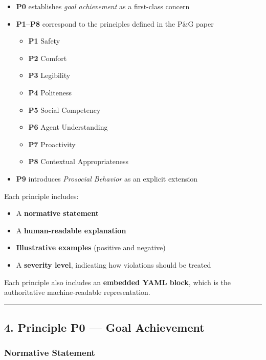 \documentclass[utf8]{frontiers_suppmat} %
\providecommand{\tightlist}{%
  \setlength{\itemsep}{0pt}\setlength{\parskip}{0pt}}
\begin{document}
\begin{itemize}
\tightlist
\item
  \textbf{P0} establishes \emph{goal achievement} as a first-class
  concern
\item
  \textbf{P1--P8} correspond to the principles defined in the P\&G paper

  \begin{itemize}
  \tightlist
  \item
    \textbf{P1} Safety
  \item
    \textbf{P2} Comfort
  \item
    \textbf{P3} Legibility
  \item
    \textbf{P4} Politeness
  \item
    \textbf{P5} Social Competency
  \item
    \textbf{P6} Agent Understanding
  \item
    \textbf{P7} Proactivity
  \item
    \textbf{P8} Contextual Appropriateness
  \end{itemize}
\item
  \textbf{P9} introduces \emph{Prosocial Behavior} as an explicit
  extension
\end{itemize}

Each principle includes:

\begin{itemize}
\tightlist
\item
  A \textbf{normative statement}
\item
  A \textbf{human-readable explanation}
\item
  \textbf{Illustrative examples} (positive and negative)
\item
  A \textbf{severity level}, indicating how violations should be treated
\end{itemize}

Each principle also includes an \textbf{embedded YAML block}, which is
the authoritative machine-readable representation.

\begin{center}\rule{0.5\linewidth}{0.5pt}\end{center}

\subsection{4. Principle P0 --- Goal
Achievement}\label{principle-p0-goal-achievement}

\subsubsection{Normative Statement}\label{normative-statement}
\end{document}

